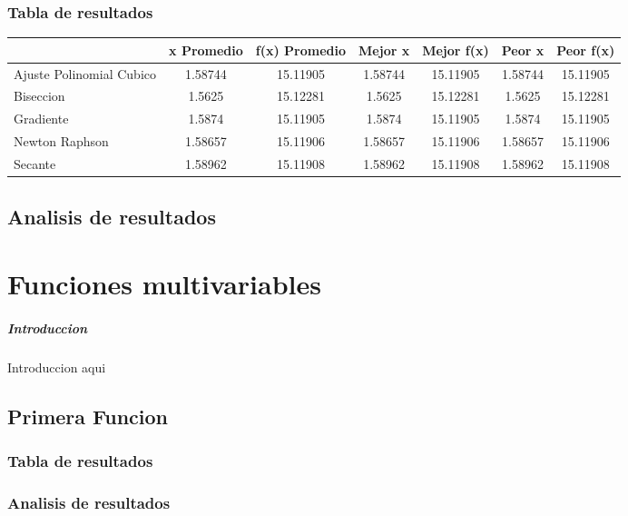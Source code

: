 \documentclass{report}
\begin{document}
            \subsection{Tabla de resultados}
            \begin{tabular}{l|c|c|c|c|c|c}
                & x Promedio & f(x) Promedio & Mejor x & Mejor f(x) & Peor x & Peor f(x)\\
                \hline
                Ajuste Polinomial Cubico & 1.58744 & 15.11905 & 1.58744 & 15.11905 & 1.58744 & 15.11905\\
                \hline
                Biseccion & 1.5625 & 15.12281 & 1.5625 & 15.12281 & 1.5625 & 15.12281\\
                \hline
                Gradiente & 1.5874 & 15.11905 & 1.5874 & 15.11905 & 1.5874 & 15.11905\\
                \hline
                Newton Raphson & 1.58657 & 15.11906 & 1.58657 & 15.11906 & 1.58657 & 15.11906\\
                \hline
                Secante & 1.58962 & 15.11908 & 1.58962 & 15.11908 & 1.58962 & 15.11908\\
                \hline
            \end{tabular}
        \pagebreak

        \section{Analisis de resultados}

    \chapter{Funciones multivariables}
        \paragraph{Introduccion}
        Introduccion aqui

        \section{Primera Funcion}
            \subsection{Tabla de resultados}
            \subsection{Analisis de resultados}
\end{document}
